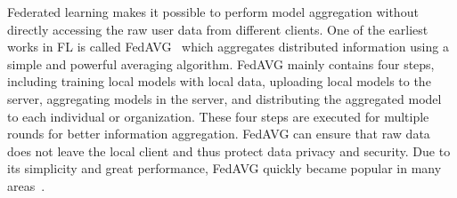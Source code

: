 \documentclass[11pt]{article}
\begin{document}
Federated learning makes it possible to perform model aggregation without directly accessing the raw user data from different clients.
One of the earliest works in FL is called FedAVG~\cite{mcmahan2017communication} which aggregates distributed information using a simple and powerful averaging algorithm.
FedAVG mainly contains four steps, including training local models with local data, uploading local models to the server, aggregating models in the server, and distributing the aggregated model to each individual or organization.
These four steps are executed for multiple rounds for better information aggregation.
FedAVG can ensure that raw data does not leave the local client and thus protect data privacy and security.
Due to its simplicity and great performance, FedAVG quickly became popular in many areas~\cite{li2020review,rodriguez2023survey,banabilah2022federated}.
\end{document}
